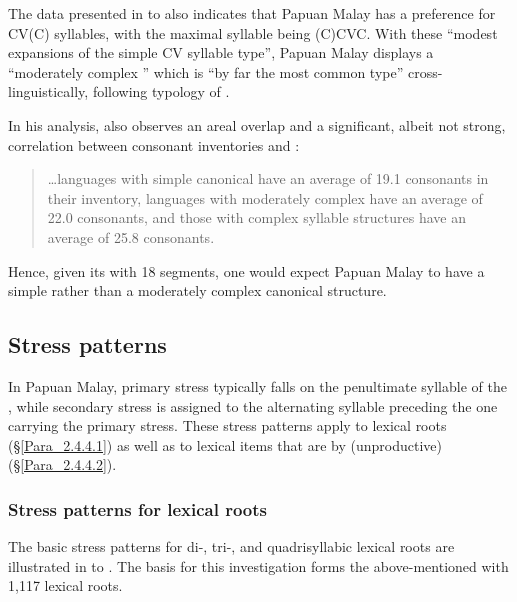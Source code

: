  
The data presented in  to  also indicates that Papuan Malay has a preference for CV(C) syllables, with the maximal syllable being (C)CVC. With these “modest expansions of the simple CV syllable type”, Papuan Malay displays a “moderately complex ” which is “by far the most common type” cross-linguis\-tically, following  typology of .
\newpage


In his analysis, \citet[5]{Maddieson.2013b} also observes an areal overlap and a significant, albeit not strong, correlation between consonant inventories and :


\begin{quote}
\ldots languages with simple canonical  have an average of 19.1 consonants in their inventory, languages with moderately complex  have an average of 22.0 consonants, and those with complex syllable structures have an average of 25.8 consonants.
\end{quote}


Hence, given its  with 18 segments, one would expect Papuan Malay to have a simple rather than a moderately complex canonical structure.


\subsection{Stress patterns\label{Para_2.4.4}}

In Papuan Malay, primary stress typically falls on the penultimate syllable of the , while secondary stress is assigned to the alternating syllable preceding the one carrying the primary stress. These stress patterns apply to lexical roots (§\ref{Para_2.4.4.1}) as well as to lexical items that are  by (unproductive)  (§\ref{Para_2.4.4.2}).


\subsubsection[Stress patterns for lexical roots]{Stress patterns for lexical roots\label{Para_2.4.4.1}}

The basic stress patterns for di-, tri-, and quadrisyllabic lexical roots are illustrated in  to . The basis for this investigation forms the above-mentioned  with 1,117 lexical roots.



